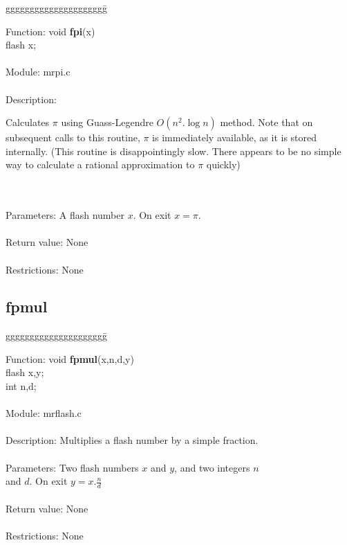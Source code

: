 \begin{tabbing}
ggggggggggggggggggggg\= \kill

      Function:      \>void {\bf fpi}(x) \\
                     \>flash x; \\
      \ \\
      Module:        \>mrpi.c \\
      \ \\
      Description:   \>
                     \parbox[t]{3in}
                     {Calculates $\pi$ using Guass-Legendre $O(n^2.\log n)$ method.
                     Note that on subsequent calls to this routine, $\pi$ is
                     immediately available, as it is stored internally.
                     (This routine is disappointingly slow. There appears to 
                     be no simple way to calculate a rational approximation 
                     to $\pi$ quickly)} \\
      \ \\
      Parameters:    \>A flash number $x$. On exit $x=\pi$. \\
      \ \\
      Return value:  \>None \\
      \ \\
      Restrictions:  \>None 
\end{tabbing}
\subsection{fpmul}
\begin{tabbing}
ggggggggggggggggggggg\= \kill

      Function:      \>void {\bf fpmul}(x,n,d,y) \\
                     \>flash x,y; \\
                     \>int n,d; \\
      \ \\
      Module:        \>mrflash.c \\
      \ \\
      Description:   \>Multiplies a flash number by a simple fraction. \\
      \ \\
      Parameters:    \>Two flash numbers $x$ and $y$, and two integers $n$  \\
                     \>and $d$. On exit $y=x.\frac{n}{d}$ \\
      \ \\
      Return value:  \>None \\
      \ \\
      Restrictions:  \>None \\
      
\end{tabbing}

